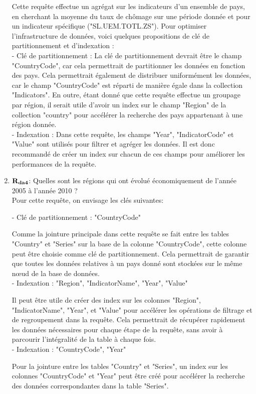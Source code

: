 \begin{enumerate}
Cette requête effectue un agrégat sur les indicateurs d'un ensemble de pays, en cherchant la moyenne du taux de chômage sur une période donnée et pour un indicateur spécifique ("SL.UEM.TOTL.ZS"). Pour optimiser l'infrastructure de données, voici quelques propositions de clé de partitionnement et d'indexation :\\

- Clé de partitionnement :
La clé de partitionnement devrait être le champ "CountryCode", car cela permettrait de partitionner les données en fonction des pays. Cela permettrait également de distribuer uniformément les données, car le champ "CountryCode" est réparti de manière égale dans la collection "Indicators". En outre, étant donné que cette requête effectue un groupage par région, il serait utile d'avoir un index sur le champ "Region" de la collection "country" pour accélérer la recherche des pays appartenant à une région donnée.\\

- Indexation :
Dans cette requête, les champs "Year", "IndicatorCode" et "Value" sont utilisés pour filtrer et agréger les données. Il est donc recommandé de créer un index sur chacun de ces champs pour améliorer les performances de la requête.
    
    \item ${\bf R_{da4}}$: Quelles sont les régions qui ont évolué économiquement de l’année 2005 à l’année 2010 ?\\
    
Pour cette requête, on envisage les clés suivantes:

- Clé de partitionnement : "CountryCode"

Comme la jointure principale dans cette requête se fait entre les tables "Country" et "Series" sur la base de la colonne "CountryCode", cette colonne peut être choisie comme clé de partitionnement. Cela permettrait de garantir que toutes les données relatives à un pays donné sont stockées sur le même nœud de la base de données.\\

- Indexation : "Region", "IndicatorName", "Year", "Value"

Il peut être utile de créer des index sur les colonnes "Region", "IndicatorName", "Year", et "Value" pour accélérer les opérations de filtrage et de regroupement dans la requête. Cela permettrait de récupérer rapidement les données nécessaires pour chaque étape de la requête, sans avoir à parcourir l'intégralité de la table à chaque fois.\\

- Indexation : "CountryCode", "Year"  

Pour la jointure entre les tables "Country" et "Series", un index sur les colonnes "CountryCode" et "Year" peut être créé pour accélérer la recherche des données correspondantes dans la table "Series".
\end{enumerate}

